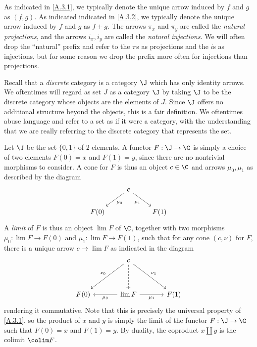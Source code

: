 \begin{notation}\label{A.3.3}
    As indicated in \cref{A.3.1}, we typically denote the unique arrow induced by $f$ and $g$ as $(f,g)$. As indicated indicated in \cref{A.3.2}, we typically denote the unique arrow induced by $f$ and $g$ as $f+g$. The arrows $\pi_x$ and $\pi_y$ are called the \emph{natural projections}, and the arrows $i_x,i_y$ are called the \emph{natural injections}. We will often drop the ``natural'' prefix and refer to the $\pi$s as projections and the $i$s as injections, but for some reason we drop the prefix more often for injections than projections.
\end{notation}

\begin{terminology}\label{A.3.4}
    Recall that a \emph{discrete} category is a category $\J$ which has only identity arrows. We oftentimes will regard as set $J$ as a category $\J$ by taking $\J$ to be the discrete category whose objects are the elements of $J$. Since $\J$ offers no additional structure beyond the objects, this is a fair definition. We oftentimes abuse language and refer to a set as if it were a category, with the understanding that we are really referring to the discrete category that represents the set.
\end{terminology}

\begin{remark}\label{A.3.5}
    Let $\J$ be the set $\{0,1\}$ of 2 elements. A functor $F : \J \to \C$ is simply a choice of two elements $F(0)=x$ and $F(1)=y$, since there are no nontrivial morphisms to consider. A cone for $F$ is thus an object $c\in\C$ and arrows $\mu_0,\mu_1$ as described by the diagram
    \[\begin{tikzcd}
	& c \\
	{F(0)} && {F(1)}
	\arrow["{\mu_0}", from=1-2, to=2-1]
	\arrow["{\mu_1}"', from=1-2, to=2-3]
    \end{tikzcd}\]
    A \emph{limit} of $F$ is thus an object $\lim F$ of $\C$, together with two morphisms $\mu_0 : \lim F \to F(0)$ and $\mu_1 : \lim F \to F(1)$, such that for any cone $(c,\nu)$ for $F$, there is a unique arrow $c\to \lim F$ as indicated in the diagram
    \[\begin{tikzcd}[row sep=3.5em, column sep=3.5em]
	& c \\
	F(0) & {\lim F} & F(1)
	\arrow["\nu_0"', from=1-2, to=2-1]
	\arrow[dashed, from=1-2, to=2-2]
	\arrow["\nu_1", from=1-2, to=2-3]
	\arrow["{\mu_0}", from=2-2, to=2-1]
	\arrow["{\mu_1}"', from=2-2, to=2-3]
    \end{tikzcd}\]
    rendering it commutative. Note that this is precisely the universal property of \cref{A.3.1}, so the product of $x$ and $y$ is simply the limit of the functor $F : \J\to\C$ such that $F(0)=x$ and $F(1)=y$. By duality, the coproduct $x\amalg y$ is the colimit $\colim F$.
\end{remark}

